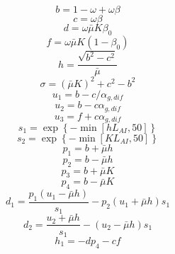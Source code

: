 \begin{equation}
b=1-\omega+\omega \beta
\end{equation}
\begin{equation}
c=\omega \beta
\end{equation}
\begin{equation}
d=\omega \bar{\mu} K \beta_{0}
\end{equation}
\begin{equation}
f=\omega \bar{\mu} K\left(1-\beta_{0}\right)
\end{equation}
\begin{equation}
h=\frac{\sqrt{b^{2}-c^{2}}}{\bar{\mu}}
\end{equation}
\begin{equation}
\sigma=(\bar{\mu} K)^{2}+c^{2}-b^{2}
\end{equation}
\begin{equation}
u_{1}=b-c / \alpha_{g, dif}
\end{equation}
\begin{equation}
u_{2}=b-c \alpha_{g, dif}
\end{equation}
\begin{equation}
u_{3}=f+c \alpha_{g, dif}
\end{equation}
\begin{equation}
s_{1}=\exp \left\{-\min \left[h L_{A I}, 50\right]\right\}
\end{equation}
\begin{equation}
s_{2}=\exp \left\{-\min \left[K L_{A I}, 50\right]\right\}
\end{equation}
\begin{equation}
p_{1}=b+\bar{\mu} h
\end{equation}
\begin{equation}
p_{2}=b-\bar{\mu} h
\end{equation}
\begin{equation}
p_{3}=b+\bar{\mu} K
\end{equation}
\begin{equation}
p_{4}=b-\bar{\mu} K
\end{equation}
\begin{equation}
d_{1}=\frac{p_{1}\left(u_{1}-\bar{\mu} h\right)}{s_{1}}-p_{2}\left(u_{1}+\bar{\mu} h\right) s_{1}
\end{equation}
\begin{equation}
d_{2}=\frac{u_{2}+\bar{\mu} h}{s_{1}}-\left(u_{2}-\bar{\mu} h\right) s_{1}
\end{equation}
\begin{equation}
h_{1}=-d p_{4}-c f
\end{equation}
